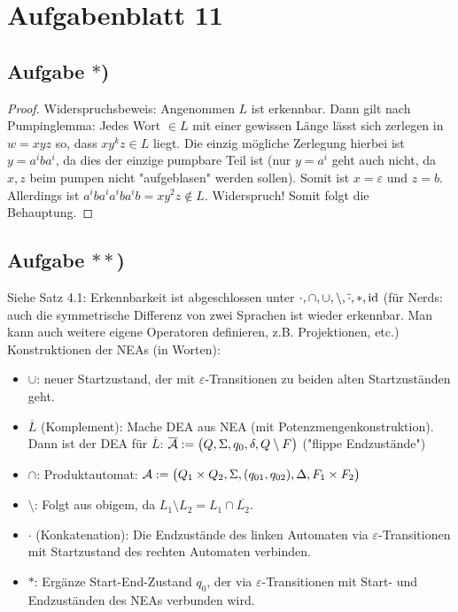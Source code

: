 
\section{Aufgabenblatt 11}
\subsection*{Aufgabe $\ast$)}

\begin{proof}
	Widerspruchsbeweis: Angenommen $L$ ist erkennbar. Dann gilt nach Pumping\-lemma:
	Jedes Wort $\in L$ mit einer gewissen Länge lässt sich zerlegen in $w=xyz$ so, dass $xy^k z\in L$ liegt.
	Die einzig mögliche Zerlegung hierbei ist $y=a^iba^i$, da dies der einzige pumpbare Teil ist (nur $y=a^i$ geht auch nicht, da $x,z$ beim pumpen nicht "aufgeblasen" werden sollen).
	Somit ist $x=\varepsilon$ und $z=b$.
	Allerdings ist $a^iba^ia^ib a^ib=xy^2z\not\in L$.
	Widerspruch! Somit folgt die Behauptung.
\end{proof}

\subsection*{Aufgabe $\ast\ast$)}
Siehe Satz 4.1: 
Erkennbarkeit ist abgeschlossen unter $\cdot,\cap,\cup,\setminus,\overline{\cdot},\ast,\operatorname{id}$ (für Nerds: auch die symmetrische Differenz von zwei Sprachen ist wieder erkennbar. Man kann auch weitere eigene Operatoren definieren, z.B. Projektionen, etc.)\\
Konstruktionen der NEAs (in Worten):
\begin{itemize}
	\item $\cup$: neuer Startzustand, der mit $\varepsilon$-Transitionen zu beiden alten Startzuständen geht.
	\item $\overline{L}$ (Komplement): Mache DEA aus NEA (mit Potenzmengenkonstruktion).
	Dann ist der DEA für $\overline{L}$: $\overline{\mathcal{A}}:=\big(Q,\Sigma,q_0,\delta,Q\setminus F\big)$ ("flippe Endzustände")
	\item $\cap$: Produktautomat: $\mathcal{A}:=\big(Q_1\times Q_2,\Sigma,(q_{01},q_{02}),\Delta,F_1\times F_2\big)$
	\item $\setminus$: Folgt aus obigem, da $L_1\setminus L_2=L_1\cap\overline{L_2}$.
	\item $\cdot$ (Konkatenation): Die Endzustände des linken Automaten via $\varepsilon$-Transitionen mit Startzustand des rechten Automaten verbinden.
	\item $\ast$: Ergänze Start-End-Zustand $q_0$, der via $\varepsilon$-Transitionen mit Start- und Endzuständen des NEAs verbunden wird.
\end{itemize}

